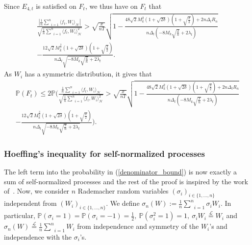 \documentclass[twoside,11pt]{article}
\newcommand{\Hk}{\mathcal{H}}
\newcommand{\nb}{n}
\newcommand{\PP}{\mathbb{P}}%
\newcommand{\PPO}{\mathbb{P} }
\begin{document}
Since $E_{4,t}$ is satisfied on $F_t$, we thus have on $F_t$ that
\begin{multline*}   
  \frac{\left |  \frac{1}{\nb} \underset{i=1}{\overset{\nb}{\sum}} \langle f_t , W_i \rangle_{\Hk} \right |}{\sqrt{\frac{1}{\nb} \underset{i=1}{\overset{\nb}{\sum}} \langle f_t , W_i \rangle_{\Hk}^2}}  
>  \sqrt{\frac{x}{\nb T}} \sqrt{1 - \frac{48 \sqrt{2} M_k^2 \left(1+ \sqrt{2\delta}\right) \left(1+ \sqrt{\frac{\delta}{2}}\right) + 2 \nb \Delta_t R_{\nb} }{\nb \Delta_t \left(- 8 M_k \sqrt{\frac{\delta}{\nb}} + 2 \lambda_t\right)}}  \\
-  \frac{12 \sqrt{2} M_k^{\frac{3}{2}} \left(1+ \sqrt{2\delta}\right) \left(1+ \sqrt{\frac{\delta}{2}}\right)}{\nb \Delta_t \sqrt{- 8 M_k \sqrt{\frac{\delta}{\nb}} + 2 \lambda_t}}  .
 \end{multline*}
 As $W_i$ has a symmetric distribution, it gives that
\begin{multline}  
  \PPO (F_t)   \leq  2\PPO \Bigg( \frac{  \frac{1}{\nb} \underset{i=1}{\overset{\nb}{\sum}} \langle f_t , W_i \rangle_{\Hk}}{\sqrt{\frac{1}{\nb} \underset{i=1}{\overset{\nb}{\sum}} \langle f_t , W_i \rangle_{\Hk}^2}}  
     >   \sqrt{\frac{x}{\nb T}} \sqrt{1 - \frac{48 \sqrt{2} M_k^2 \left(1+ \sqrt{2\delta}\right) \left(1+ \sqrt{\frac{\delta}{2}}\right) + 2 \nb \Delta_t R_{\nb} }{\nb \Delta_t \left(- 8 M_k \sqrt{\frac{\delta}{\nb}} + 2 \lambda_t\right)}} \\
     - \frac{12 \sqrt{2} M_k^{\frac{3}{2}} \left(1+ \sqrt{2\delta}\right) \left(1+ \sqrt{\frac{\delta}{2}}\right)}{\nb \Delta_t \sqrt{- 8 M_k \sqrt{\frac{\delta}{\nb}} + 2 \lambda_t}} \Bigg).
    \label{denominator_bound} 
  \end{multline}
\subsubsection*{Hoeffing's inequality for self-normalized processes} 
The left term into the probability in (\ref{denominator_bound}) is now exactly a sum of self-normalized processes and the rest of the proof is inspired by the work of~\citep{bertail2008exponential}. 
Now, we consider $\nb$ Rademacher random variables $\left(\sigma_i\right)_{i \in \{1,\ldots,\nb\}}$ independent from $\left(W_i\right)_{i \in \{1,\ldots,\nb\}}$.
We define $\sigma_{\nb}(W) := \frac{1}{\nb} \underset{i=1}{\overset{\nb}{\sum}} \sigma_{i} W_i$. 
In particular, $\PP(\sigma_i = 1) =  \PP(\sigma_i = -1) = \frac{1}{2}, \ \PP(\sigma_i^2 = 1) = 1, \ \sigma_{i} W_i \overset{\mathcal{L}}{=} W_i$ and  $\sigma_{\nb}(W) \overset{\mathcal{L}}{=} \frac{1}{\nb} \underset{i=1}{\overset{\nb}{\sum}} W_i$ from independence and symmetry of the $W_i$'s and independence with the $\sigma_i$'s.  
\end{document}
